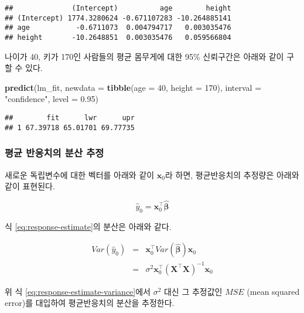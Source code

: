 \documentclass[]{book}
\newenvironment{Shaded}{\begin{snugshade}}{\end{snugshade}}
\newcommand{\DataTypeTok}[1]{\textcolor[rgb]{0.13,0.29,0.53}{#1}}
\newcommand{\DecValTok}[1]{\textcolor[rgb]{0.00,0.00,0.81}{#1}}
\newcommand{\FloatTok}[1]{\textcolor[rgb]{0.00,0.00,0.81}{#1}}
\newcommand{\KeywordTok}[1]{\textcolor[rgb]{0.13,0.29,0.53}{\textbf{#1}}}
\newcommand{\NormalTok}[1]{#1}
\newcommand{\StringTok}[1]{\textcolor[rgb]{0.31,0.60,0.02}{#1}}
\begin{document}
\begin{verbatim}
##              (Intercept)          age        height
## (Intercept) 1774.3280624 -0.671107283 -10.264885141
## age           -0.6711073  0.004794717   0.003035476
## height       -10.2648851  0.003035476   0.059566804
\end{verbatim}

나이가 40, 키가 170인 사람들의 평균 몸무게에 대한 95\% 신뢰구간은 아래와 같이 구할 수 있다.

\begin{Shaded}
\begin{Highlighting}[]
\KeywordTok{predict}\NormalTok{(lm_fit, }\DataTypeTok{newdata =} \KeywordTok{tibble}\NormalTok{(}\DataTypeTok{age =} \DecValTok{40}\NormalTok{, }\DataTypeTok{height =} \DecValTok{170}\NormalTok{),}
        \DataTypeTok{interval =} \StringTok{"confidence"}\NormalTok{, }\DataTypeTok{level =} \FloatTok{0.95}\NormalTok{)}
\end{Highlighting}
\end{Shaded}

\begin{verbatim}
##        fit      lwr      upr
## 1 67.39718 65.01701 69.77735
\end{verbatim}

\hypertarget{regression-response-confidence-variance}{%
\subsubsection{평균 반응치의 분산 추정}\label{regression-response-confidence-variance}}

새로운 독립변수에 대한 벡터를 아래와 같이 \(\mathbf{x}_0\)라 하면, 평균반응치의 추정량은 아래와 같이 표현된다.

\begin{equation}
\hat{y}_0 = \mathbf{x}_0^\top \hat{\boldsymbol{\beta}} \label{eq:response-estimate}
\end{equation}

식 \eqref{eq:response-estimate}의 분산은 아래와 같다.

\begin{eqnarray}
Var(\hat{y}_0) &=& \mathbf{x}_0^\top Var(\hat{\boldsymbol{\beta}}) \mathbf{x}_0\\
&=& \sigma^2 \mathbf{x}_0^\top \left(\mathbf{X}^\top \mathbf{X}\right)^{-1} \mathbf{x}_0 \label{eq:response-estimate-variance}
\end{eqnarray}

위 식 \eqref{eq:response-estimate-variance}에서 \(\sigma^2\) 대신 그 추정값인 \(MSE\) (mean squared error)를 대입하여 평균반응치의 분산을 추정한다.
\end{document}
